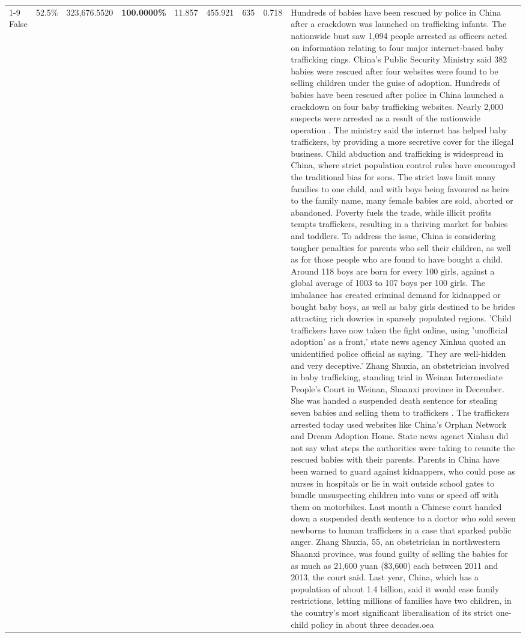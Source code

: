 \begin{table}[H]
\begin{tabular}{lllrlllll}
\cline{1-9}
False & 52.5\% & 323,676.5520 & \bfseries \color{red} 100.0000\% & 11.857 & 455.921 & 635 & 0.718 & Hundreds of babies have been rescued by police in China after a crackdown was launched on trafficking infants. The nationwide bust saw 1,094 people arrested as officers acted on information relating to four major internet-based baby trafficking rings. China's Public Security Ministry said 382 babies were rescued after four websites were found to be selling children under the guise of adoption. Hundreds of babies have been rescued after police in China launched a crackdown on four baby trafficking websites. Nearly 2,000 suspects were arrested as a result of the nationwide operation . The ministry said the internet has helped baby traffickers, by providing a more secretive cover for the illegal business. Child abduction and trafficking is widespread in China, where strict population control rules have encouraged the traditional bias for sons. The strict laws limit many families to one child, and with boys being favoured as heirs to the family name, many female babies are sold, aborted or abandoned. Poverty fuels the trade, while illicit profits tempts traffickers, resulting in a thriving market for babies and toddlers. To address the issue, China is considering tougher penalties for parents who sell their children, as well as for those people who are found to have bought a child. Around 118 boys are born for every 100 girls, against a global average of 1003 to 107 boys per 100 girls. The imbalance has created criminal demand for kidnapped or bought baby boys, as well as baby girls destined to be brides attracting rich dowries in sparsely populated regions. 'Child traffickers have now taken the fight online, using 'unofficial adoption' as a front,' state news agency Xinhua quoted an unidentified police official as saying. 'They are well-hidden and very deceptive.' Zhang Shuxia, an obstetrician involved in baby trafficking, standing trial in Weinan Intermediate People's Court in Weinan, Shaanxi province in December. She was handed a suspended death sentence for stealing seven babies and selling them to traffickers . The traffickers arrested today used websites like China's Orphan Network and Dream Adoption Home. State news agenct Xinhau did not say what steps the authorities were taking to reunite the rescued babies with their parents. Parents in China have been warned to guard against kidnappers, who could pose as nurses in hospitals or lie in wait outside school gates to bundle unsuspecting children into vans or speed off with them on motorbikes. Last month a Chinese court handed down a suspended death sentence to a doctor who sold seven newborns to human traffickers in a case that sparked public anger. Zhang Shuxia, 55, an obstetrician in northwestern Shaanxi province, was found guilty of selling the babies for as much as 21,600 yuan (\$3,600) each between 2011 and 2013, the court said. Last year, China, which has a population of about 1.4 billion, said it would ease family restrictions, letting millions of families have two children, in the country's most significant liberalisation of its strict one-child policy in about three decades.oea \\

\end{tabular}
\end{table}
